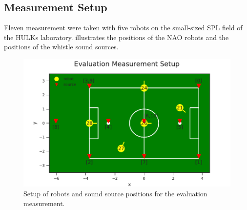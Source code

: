 \subsection{Measurement Setup}
\label{subsec:04_labMeasurements}

Eleven measurement were taken with five robots on the small-sized \ac{SPL} field
of the HULKs laboratory.
 illustrates the positions of the NAO robots
and the positions of the whistle sound sources.
\begin{figure}[ht]
	\centering
		\includegraphics[]{figures/evaluation/setup}
	\caption{Setup of robots and sound source positions for the evaluation measurement.}
    \label{fig:04_setup}
\end{figure}

